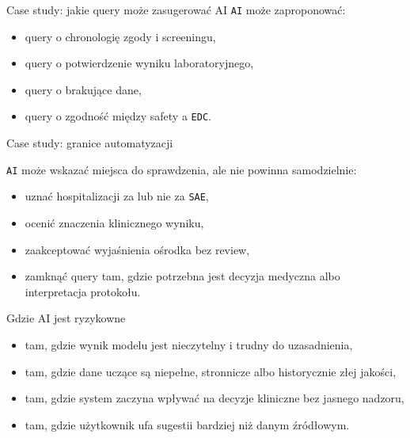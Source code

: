 \begin{frame}{Case study: jakie query może zasugerować AI}
  \texttt{AI} może zaproponować:
  \begin{itemize}
    \item query o chronologię zgody i screeningu,
    \item query o potwierdzenie wyniku laboratoryjnego,
    \item query o brakujące dane,
    \item query o zgodność między safety a \texttt{EDC}.
  \end{itemize}
\end{frame}

\begin{frame}{Case study: granice automatyzacji}
  \begin{QuestionBox}
  \texttt{AI} może wskazać miejsca do sprawdzenia, ale nie powinna samodzielnie:
  \begin{itemize}
    \item uznać hospitalizacji za lub nie za \texttt{SAE},
    \item ocenić znaczenia klinicznego wyniku,
    \item zaakceptować wyjaśnienia ośrodka bez review,
    \item zamknąć query tam, gdzie potrzebna jest decyzja medyczna albo interpretacja protokołu.
  \end{itemize}
  \end{QuestionBox}
\end{frame}

\begin{frame}{Gdzie AI jest ryzykowne}
  \begin{itemize}
    \item tam, gdzie wynik modelu jest nieczytelny i trudny do uzasadnienia,
    \item tam, gdzie dane uczące są niepełne, stronnicze albo historycznie złej jakości,
    \item tam, gdzie system zaczyna wpływać na decyzje kliniczne bez jasnego nadzoru,
    \item tam, gdzie użytkownik ufa sugestii bardziej niż danym źródłowym.
  \end{itemize}
\end{frame}

